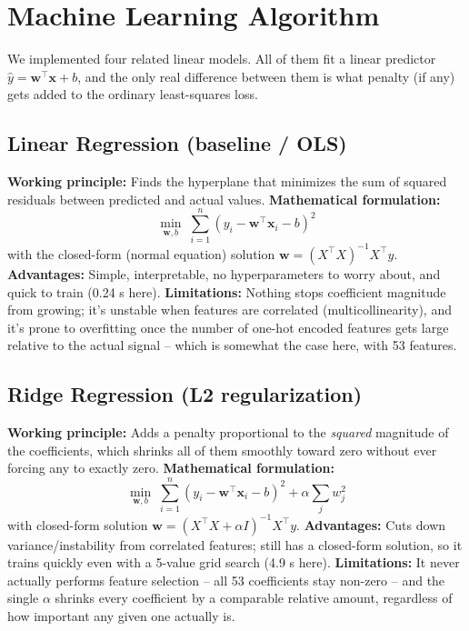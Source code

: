 \documentclass[12pt,a4paper]{article}
\begin{document}
\section{Machine Learning Algorithm}\label{sec:algorithm}

We implemented four related linear models. All of them fit a linear predictor $\hat{y} = \mathbf{w}^\top \mathbf{x} + b$, and the only real difference between them is what penalty (if any) gets added to the ordinary least-squares loss.

\subsection*{Linear Regression (baseline / OLS)}
\textbf{Working principle:} Finds the hyperplane that minimizes the sum of squared residuals between predicted and actual values.
\textbf{Mathematical formulation:}
\[
\min_{\mathbf{w}, b} \; \sum_{i=1}^{n} \left(y_i - \mathbf{w}^\top \mathbf{x}_i - b\right)^2
\]
with the closed-form (normal equation) solution $\mathbf{w} = (X^\top X)^{-1} X^\top y$.
\textbf{Advantages:} Simple, interpretable, no hyperparameters to worry about, and quick to train (0.24 s here).
\textbf{Limitations:} Nothing stops coefficient magnitude from growing; it's unstable when features are correlated (multicollinearity), and it's prone to overfitting once the number of one-hot encoded features gets large relative to the actual signal -- which is somewhat the case here, with 53 features.

\subsection*{Ridge Regression (L2 regularization)}
\textbf{Working principle:} Adds a penalty proportional to the \textit{squared} magnitude of the coefficients, which shrinks all of them smoothly toward zero without ever forcing any to exactly zero.
\textbf{Mathematical formulation:}
\[
\min_{\mathbf{w}, b} \; \sum_{i=1}^{n} \left(y_i - \mathbf{w}^\top \mathbf{x}_i - b\right)^2 + \alpha \sum_{j} w_j^2
\]
with closed-form solution $\mathbf{w} = (X^\top X + \alpha I)^{-1} X^\top y$.
\textbf{Advantages:} Cuts down variance/instability from correlated features; still has a closed-form solution, so it trains quickly even with a 5-value grid search (4.9 s here).
\textbf{Limitations:} It never actually performs feature selection -- all 53 coefficients stay non-zero -- and the single $\alpha$ shrinks every coefficient by a comparable relative amount, regardless of how important any given one actually is.
\end{document}
